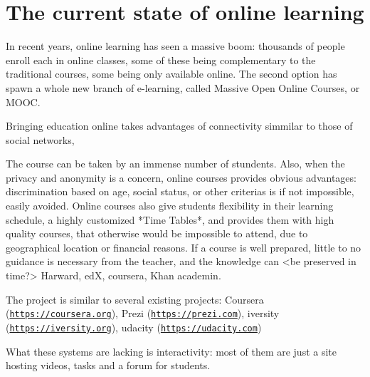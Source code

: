 \chapter{The current state of online learning}

In recent years, online learning has seen a massive boom: thousands of people
enroll each in online classes, some of these being complementary to the
traditional courses, some being only available online. The second option has
spawn a whole new branch of e-learning, called Massive Open Online Courses, or
MOOC.

Bringing education online takes advantages of connectivity simmilar to those of
social networks,

The course can be taken by an immense number of stundents.
Also, when the privacy and anonymity is a concern, online courses provides obvious
advantages: discrimination based on age, social status, or other criterias is if
not impossible, easily avoided.
Online courses also give students flexibility in their learning
schedule, a highly customized *Time Tables*, and provides them with high quality
courses, that otherwise would be impossible to attend, due to geographical
location or financial reasons.
If a course is well prepared, little to no guidance is necessary from the teacher,
and the knowledge can <be preserved in time?>
Harward, edX, coursera, Khan academin.

The project is similar to several existing projects:
Coursera (\href{https://coursera.org}{\texttt{https://coursera.org}}),
Prezi (\href{https://prezi.com}{\texttt{https://prezi.com}}),
iversity (\href{htpps://iversity.org}{\texttt{https://iversity.org}}),
udacity (\href{https://udacity.com}{\texttt{https://udacity.com}})

What these systems are lacking is interactivity: most of them are just a site
hosting videos, tasks and a forum for students.

